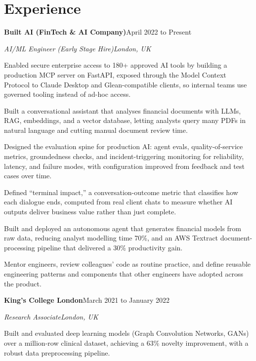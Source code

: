 \documentclass[10pt,a4paper]{article}
\newcommand{\entry}[4]{%
  {\color{company}\bfseries #1}\hfill {\color{muted}#2}\par
  \vspace{1pt}
  {\itshape #3}\hfill {\color{muted}\itshape #4}\par
  \vspace{3pt}%
}
\begin{document}
\section{Experience}
\entry{Built AI (FinTech \& AI Company)}{April 2022 to Present}{AI/ML Engineer (Early Stage Hire)}{London, UK}
\begin{tight}
  \item Enabled secure enterprise access to 180+ approved AI tools by building a production MCP server on FastAPI, exposed through the Model Context Protocol to Claude Desktop and Glean-compatible clients, so internal teams use governed tooling instead of ad-hoc access.
  \item Built a conversational assistant that analyses financial documents with LLMs, RAG, embeddings, and a vector database, letting analysts query many PDFs in natural language and cutting manual document review time.
  \item Designed the evaluation spine for production AI: agent evals, quality-of-service metrics, groundedness checks, and incident-triggering monitoring for reliability, latency, and failure modes, with configuration improved from feedback and test cases over time.
  \item Defined ``terminal impact,'' a conversation-outcome metric that classifies how each dialogue ends, computed from real client chats to measure whether AI outputs deliver business value rather than just complete.
  \item Built and deployed an autonomous agent that generates financial models from raw data, reducing analyst modelling time 70\%, and an AWS Textract document-processing pipeline that delivered a 30\% productivity gain.
  \item Mentor engineers, review colleagues' code as routine practice, and define reusable engineering patterns and components that other engineers have adopted across the product.
\end{tight}

\entry{King's College London}{March 2021 to January 2022}{Research Associate}{London, UK}
\begin{tight}
  \item Built and evaluated deep learning models (Graph Convolution Networks, GANs) over a million-row clinical dataset, achieving a 63\% novelty improvement, with a robust data preprocessing pipeline.
\end{tight}

\end{document}

